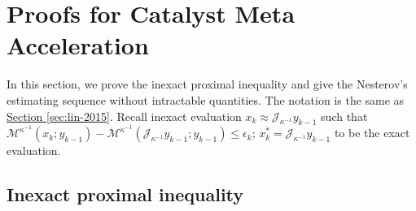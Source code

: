 \documentclass[12pt]{article}
\begin{document}
        
\section{Proofs for Catalyst Meta Acceleration}
    In this section, we prove the inexact proximal inequality and give the Nesterov's estimating sequence without intractable quantities. 
    The notation is the same as
    \hyperref[sec:lin-2015]{Section \ref*{sec:lin-2015}}. 
    Recall inexact evaluation $x_k \approx \mathcal J_{\kappa^{-1}}y_{k - 1}$ such that $\mathcal M^{\kappa^{-1}}(x_k; y_{k - 1}) - \mathcal M^{\kappa^{-1}}(\mathcal J_{\kappa^{-1}}y_{k - 1}; y_{k - 1}) \le \epsilon_k$; $x_k^* = \mathcal J_{\kappa^{-1}}y_{k - 1}$ to be the exact evaluation. 
    
    \subsection{Inexact proximal inequality}\label{app:sec:inxct-pg-ineq}
\end{document}

